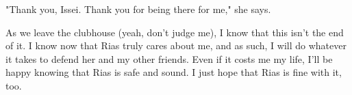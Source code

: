 \documentclass{article}
\begin{document}
"Thank you, Issei. Thank you for being there for me," she says.

As we leave the clubhouse (yeah, don't judge me), I know that this isn't the end of it. I know now that Rias truly cares about me, and as such, I will do whatever it takes to defend her and my other friends. Even if it costs me my life, I'll be happy knowing that Rias is safe and sound. I just hope that Rias is fine with it, too.
\end{document}
